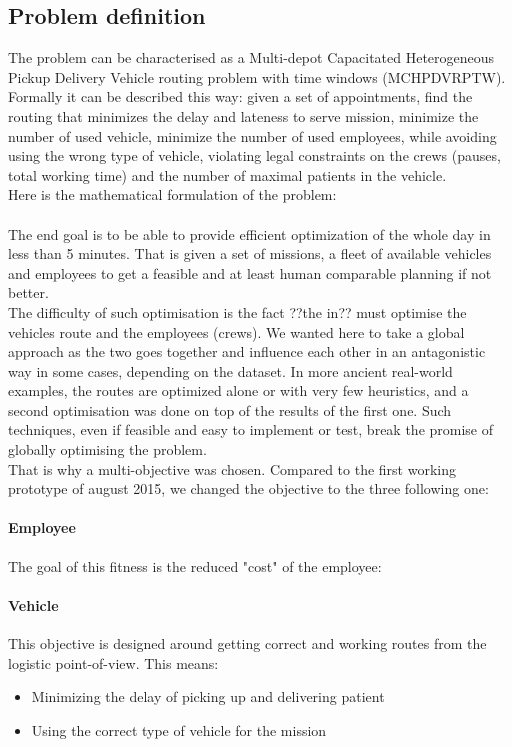 \documentclass[12pt]{memoir}
\begin{document}

\subsection{Problem definition}
The problem can be characterised as a Multi-depot Capacitated Heterogeneous Pickup
Delivery Vehicle routing problem with time windows (MCHPDVRPTW). \\
Formally it can be described this way: given a set of appointments, find the routing that minimizes the
delay and lateness to serve mission, minimize the number of used vehicle, minimize
the number of used employees, while avoiding using the wrong type of vehicle,
violating legal constraints on the crews (pauses, total working time) and the number
of maximal patients in the vehicle.\\
Here is the mathematical formulation of the problem:
%
%
\\
\\
The end goal is to be able to provide efficient optimization of the whole day in
less than 5 minutes. That is given a set of missions, a fleet of available vehicles
and employees to get a feasible and at least human comparable planning if not
better. \\
The difficulty of such optimisation is the fact ??the in?? must optimise the vehicles
route and the employees (crews). We wanted here to take a global approach as the two
goes together and influence each other in an antagonistic way in some cases, depending
on the dataset. In more ancient real-world examples, the routes are optimized alone
or with very few heuristics, and a second optimisation was done on top of the results
of the first one. Such techniques, even if feasible and easy to implement or test,
break the promise of globally optimising the problem.\\
That is why a multi-objective was chosen. Compared to the first working prototype
of august 2015, we changed the objective to the three following one:

\paragraph{Employee} %
\label{par:Employee}
The goal of this fitness is the reduced "cost" of the employee:


\paragraph{Vehicle} %
\label{par:Vehicle}
This objective is designed around getting correct and working routes from the
logistic point-of-view. This means:
\begin{itemize}
  \item Minimizing the delay of picking up and delivering patient
  \item Using the correct type of vehicle for the mission
\end{itemize}
\end{document}
